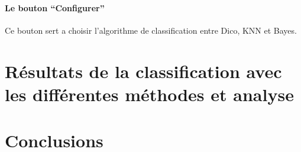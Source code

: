 \documentclass[a4paper,10pt]{report}
\begin{document}
      \subsubsection{Le bouton ``Configurer''}
	Ce bouton sert a choisir l'algorithme de classification entre Dico, KNN et Bayes. 
\chapter{Résultats de la classification avec les différentes méthodes et analyse}
\chapter{Conclusions}
\end{document}
